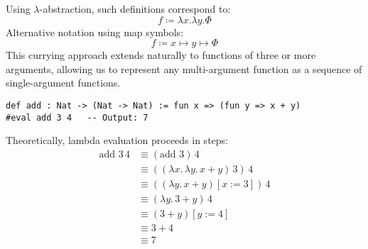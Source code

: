 Using $\lambda$-abstraction, such definitions correspond to:
$$ f \coloneqq \lambda x. \lambda y. \Phi $$
Alternative notation using map symbols:
$$ f \coloneqq x \mapsto y \mapsto \Phi $$
This currying approach extends naturally to functions of three or more arguments, allowing us to represent any multi-argument function as a sequence of single-argument functions.
\begin{example}\mbox{}
  \begin{lstlisting}[language=lean]
def add : Nat -> (Nat -> Nat) := fun x => (fun y => x + y)
#eval add 3 4   -- Output: 7
\end{lstlisting}
  Theoretically, lambda evaluation proceeds in steps:
  \begin{align*}
    \text{add } 3\, 4 & \equiv (\text{add } 3)\, 4                         \\
                      & \equiv ((\lambda x.\, \lambda y.\, x + y)\, 3)\, 4 \\
                      & \equiv ((\lambda y.\, x + y)[x := 3])\, 4          \\
                      & \equiv (\lambda y.\, 3 + y)\, 4                    \\
                      & \equiv (3 + y)[y := 4]                             \\
                      & \equiv 3 + 4                                       \\
                      & \equiv 7
  \end{align*}
\end{example}



